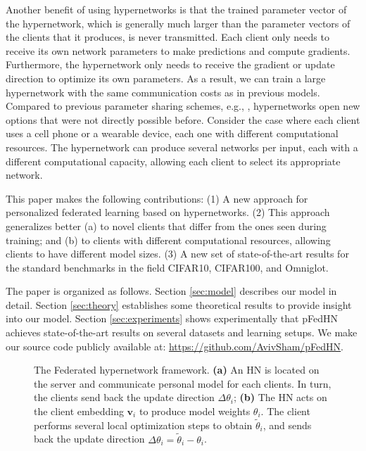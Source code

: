 \documentclass{article}
\newcommand{\bv}{\boldsymbol{v}}
\newcommand\ourmethod{pFedHN}
\begin{document}
Another benefit of using hypernetworks is that the trained parameter vector of the hypernetwork, which is generally much larger than the parameter vectors of the clients that it produces, is never transmitted. Each client only needs to receive its own network parameters to make predictions and compute gradients. Furthermore, the hypernetwork only needs to receive the gradient or update direction to optimize its own parameters.  As a result, we can train a large hypernetwork with the same communication costs as in previous models. Compared to previous parameter sharing schemes, e.g., \citet{Dinh2020PersonalizedFL, McMahan2017CommunicationEfficientLO}, hypernetworks open new options that were not directly possible before. Consider the case where each client uses a cell phone or a wearable device, each one with different computational resources. 
The hypernetwork can produce several networks per input, each with a different computational capacity, allowing each client to select its appropriate network.

This paper makes the following contributions: (1) A new approach for personalized federated learning based on hypernetworks. 
(2) This approach generalizes better (a) to novel clients that differ from the ones seen during training; and (b) to clients with different computational resources, allowing clients to have different model sizes.   
(3) A new set of state-of-the-art results for the standard benchmarks in the field CIFAR10, CIFAR100, and Omniglot.


The paper is organized as follows. Section \ref{sec:model} describes our model in detail. Section \ref{sec:theory} establishes some theoretical results to provide insight into our model. Section \ref{sec:experiments} shows experimentally that \ourmethod{} achieves state-of-the-art results on several datasets and learning setups. We make our source code publicly available at: \textcolor{magenta}{\url{https://github.com/AvivSham/pFedHN}}. 



\begin{figure*}[t]
\centering
    \begin{subfigure}[]{
    \texttt{[image: figures/arch.png]}
    }
    \label{fig:global_arch}
    \end{subfigure}
    \hfill
    \begin{subfigure}[]{
    \texttt{[image: figures/arch\_local.png]}
    }
    \label{fig:arch_local}
     \end{subfigure}
    \caption{The Federated hypernetwork framework. \textbf{(a)} An HN is located on the server and communicate personal model for each clients. In turn, the clients send back the update direction $\Delta \theta_i$;
    \textbf{(b)} The HN acts on the client embedding $\bv_i$ to produce model weights $\theta_i$. The client performs several local optimization steps to obtain $\tilde{\theta}_i$, and sends back the update direction $\Delta\theta_i=\tilde{\theta}_i-\theta_i$.}
    \label{fig:arch}
\end{figure*}
 
\end{document}
